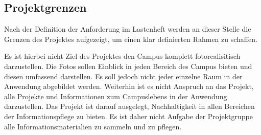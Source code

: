 \subsection{Projektgrenzen}
\label{sec:Projektgrenzen}

Nach der Definition der Anforderung im Lastenheft werden an dieser Stelle die
Grenzen des Projektes aufgezeigt, um einen klar definierten Rahmen zu schaffen.

Es ist hierbei nicht Ziel des Projektes den Campus komplett fotorealisitisch
darzustellen. Die Fotos sollen Einblick in jeden Bereich des Campus bieten und
diesen umfassend darstellen. Es soll jedoch nicht jeder einzelne Raum in
der Anwendung abgebildet werden. Weiterhin ist es nicht Anspruch an das
Projekt, alle Projekte und Informationen zum Campuslebens in der Anwendung
darzustellen. Das Projekt ist darauf ausgelegt, Nachhaltigkeit in allen
Bereichen der Informationspflege zu bieten. Es ist daher nicht Aufgabe der
Projektgruppe alle Informationsmaterialien zu sammeln und zu pflegen.
